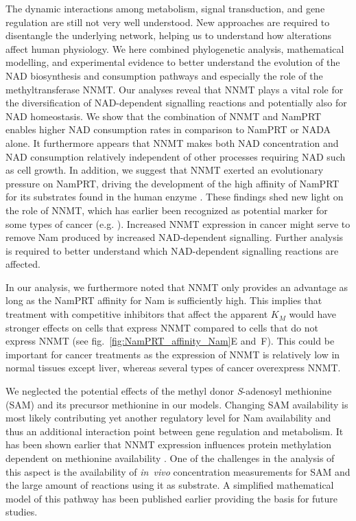 The dynamic interactions among metabolism, signal transduction, and gene regulation are still not very well understood. New approaches are required to disentangle the underlying network, helping us to understand how alterations affect human physiology. We here combined phylogenetic analysis, mathematical modelling, and experimental evidence to better understand the evolution of the NAD biosynthesis and consumption pathways and especially the role of the methyltransferase NNMT. Our analyses reveal that NNMT plays a vital role for the diversification of NAD-dependent signalling reactions and potentially also for NAD homeostasis. We show that the combination of NNMT and NamPRT enables higher NAD consumption rates in comparison to NamPRT or NADA alone. It furthermore appears that NNMT makes both NAD concentration and NAD consumption relatively independent of other processes requiring NAD such as cell growth. In addition, we suggest that NNMT exerted an evolutionary pressure on NamPRT, driving the development of the high affinity of NamPRT for its substrates found in the human enzyme \cite{Burgos2008}. These findings shed new light on the role of NNMT, which has earlier been recognized as potential marker for some types of cancer (e.g. \cite{Okamura1998}). Increased NNMT expression in cancer might serve to remove Nam produced by increased NAD-dependent signalling. Further analysis is required to better understand which NAD-dependent signalling reactions are affected.

In our analysis, we furthermore noted that NNMT only provides an advantage as long as the NamPRT affinity for Nam is sufficiently high. This implies that treatment with competitive inhibitors that affect the apparent $K_{M}$ would have stronger effects on cells that express NNMT compared to cells that do not express NNMT (see fig.~\ref{fig:NamPRT_affinity_Nam}E and~F). This could be important for cancer treatments as the expression of NNMT is relatively low in normal tissues except liver, whereas several types of cancer overexpress NNMT.

We neglected the potential effects of the methyl donor \textit{S}-adenosyl methionine (SAM) and its precursor methionine in our models. Changing SAM availability is most likely contributing yet another regulatory level for Nam availability and thus an additional interaction point between gene regulation and metabolism. It has been shown earlier that NNMT expression influences protein methylation dependent on methionine availability \cite{Ulanovskaya2013}. One of the challenges in the analysis of this aspect is the availability of \textit{in~vivo} concentration measurements for SAM and the large amount of reactions using it as substrate. A simplified mathematical model of this pathway has been published earlier \cite{Reed2004} providing the basis for future studies.

